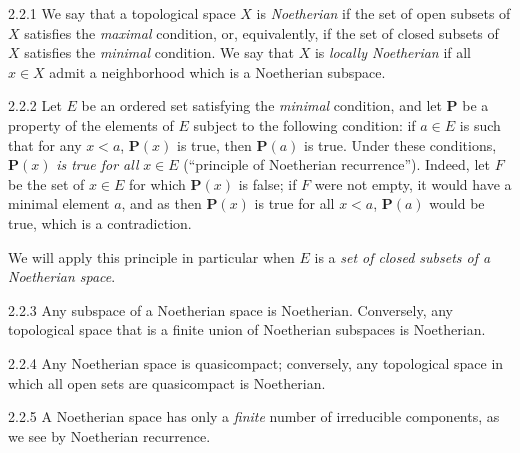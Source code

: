 
\begin{env}{2.2.1}
\label{env-0.2.2.1}
We say that a topological space $X$ is \emph{Noetherian} if the set of open
subsets of $X$ satisfies the \emph{maximal} condition, or, equivalently, if the set of closed
subsets of $X$ satisfies the \emph{minimal} condition. We say that $X$ is
\emph{locally Noetherian} if all $x\in X$ admit a neighborhood which is a Noetherian subspace.
\end{env}

\begin{env}{2.2.2}
\label{env-0.2.2.2}
Let $E$ be an ordered set satisfying the \emph{minimal} condition, and let $\mathbf{P}$ be a
property of the elements of $E$ subject to the following condition: if $a\in E$ is such that
for any $x<a$, $\mathbf{P}(x)$ is true, then $\mathbf{P}(a)$ is true. Under these conditions,
$\mathbf{P}(x)$ \emph{is true for all} $x\in E$
(``principle of Noetherian recurrence''). Indeed, let $F$ be the set of $x\in E$ for
which $\mathbf{P}(x)$ is false; if $F$ were not empty, it would have a minimal element $a$,
and as then $\mathbf{P}(x)$ is true for all $x<a$, $\mathbf{P}(a)$ would be true, which is
a contradiction.

We will apply this principle in particular when $E$ is a
\emph{set of closed subsets of a Noetherian space}.
\end{env}

\begin{env}{2.2.3}
\label{env-0.2.2.3}
Any subspace of a Noetherian space is Noetherian. Conversely,
any topological space that is a finite union of Noetherian subspaces is Noetherian.
\end{env}

\begin{env}{2.2.4}
\label{env-0.2.2.4}
Any Noetherian space is quasicompact; conversely, any  topological space in which all
open sets are quasicompact is Noetherian.
\end{env}

\begin{env}{2.2.5}
\label{env-0.2.2.5}
A Noetherian space has only a \emph{finite} number of irreducible components,
as we see by Noetherian recurrence.
\end{env}

